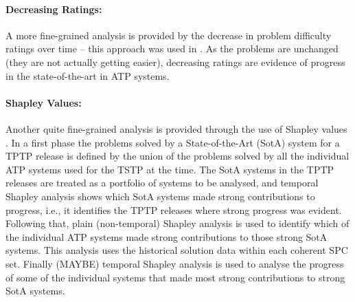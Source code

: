 \documentclass[runningheads]{llncs}
\begin{document}
\paragraph{Decreasing Ratings:}
A more fine-grained analysis is provided by the decrease in problem difficulty ratings over
time -- this approach was used in \cite{SFS01}.
As the problems are unchanged (they are not actually getting easier), decreasing ratings are 
evidence of progress in the state-of-the-art in ATP systems.

\paragraph{Shapley Values:}
Another quite fine-grained analysis is provided through the use of Shapley values 
\cite{XH+12,FK+16,KF+19}.
In a first phase the problems solved by a State-of-the-Art (SotA) system for a TPTP release is 
defined by the union of the problems solved by all the individual ATP systems used for the TSTP 
at the time.
The SotA systems in the TPTP releases are treated as a portfolio of systems to be analysed, and 
temporal Shapley analysis shows which SotA systems made strong contributions to progress, i.e., it
identifies the TPTP releases where strong progress was evident.
Following that, plain (non-temporal) Shapley analysis is used to identify which of the individual 
ATP systems made strong contributions to those strong SotA systems.
This analysis uses the historical solution data within each coherent SPC set.
Finally (MAYBE) temporal Shapley analysis is used to analyse the progress of some of the
individual systems that made most strong contributions to strong SotA systems.
\end{document}
